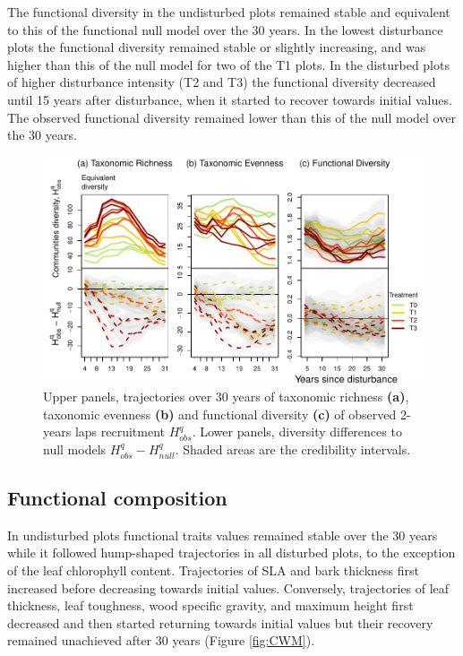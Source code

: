\documentclass[fleqn,10pt]{ArtEcoFoG} %
\begin{document}
The functional diversity in the undisturbed plots remained stable and
equivalent to this of the functional null model over the 30 years. In
the lowest disturbance plots the functional diversity remained stable or
slightly increasing, and was higher than this of the null model for two
of the T1 plots. In the disturbed plots of higher disturbance intensity
(T2 and T3) the functional diversity decreased until 15 years after
disturbance, when it started to recover towards initial values. The
observed functional diversity remained lower than this of the null model
over the 30 years.

\begin{figure}

{\centering \includegraphics{RecruitmentTrajectories_files/figure-latex/DivTraj-1} 

}

\caption{Upper panels, trajectories over 30 years of taxonomic richness \textbf{(a)}, taxonomic evenness \textbf{(b)} and functional diversity \textbf{(c)} of observed 2-years laps recruitment $H_{obs}^q$. Lower panels, diversity differences to null models $H_{obs}^q - H_{null}^q$. Shaded areas are the credibility intervals.}\label{fig:DivTraj}
\end{figure}

\subsection{Functional composition}\label{functional-composition}

In undisturbed plots functional traits values remained stable over the
30 years while it followed hump-shaped trajectories in all disturbed
plots, to the exception of the leaf chlorophyll content. Trajectories of
SLA and bark thickness first increased before decreasing towards initial
values. Conversely, trajectories of leaf thickness, leaf toughness, wood
specific gravity, and maximum height first decreased and then started
returning towards initial values but their recovery remained unachieved
after 30 years (Figure \ref{fig:CWM}).
\end{document}
